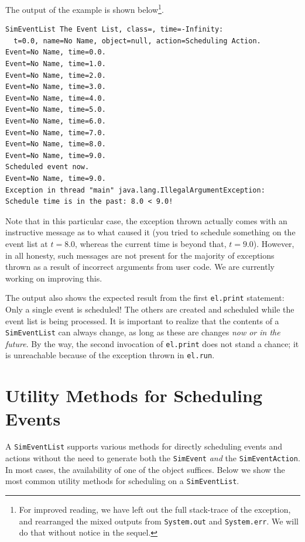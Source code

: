 \documentclass[12pt]{book}
\begin{document}
The output of the example is shown below\footnote{
  For improved reading, we have left out the full stack-trace of the exception,
  and rearranged the mixed outputs from \lstinline{System.out} and \lstinline{System.err}.
  We will do that without notice in the sequel.
}.
\begin{lstlisting}[basicstyle=\tiny]
SimEventList The Event List, class=, time=-Infinity:
  t=0.0, name=No Name, object=null, action=Scheduling Action.
Event=No Name, time=0.0.
Event=No Name, time=1.0.
Event=No Name, time=2.0.
Event=No Name, time=3.0.
Event=No Name, time=4.0.
Event=No Name, time=5.0.
Event=No Name, time=6.0.
Event=No Name, time=7.0.
Event=No Name, time=8.0.
Event=No Name, time=9.0.
Scheduled event now.
Event=No Name, time=9.0.
Exception in thread "main" java.lang.IllegalArgumentException:
Schedule time is in the past: 8.0 < 9.0!
\end{lstlisting}
Note that in this particular case,
  the exception thrown actually comes with an
  instructive message as to what caused it
  (you tried to schedule something on the event list at $t=8.0$,
   whereas the current time is beyond that, $t=9.0$).
However, in all honesty,
  such messages are not present
  for the majority of exceptions thrown
  as a result of incorrect arguments from user code.
We are currently working on improving this.

The output also shows the expected result from the first \lstinline{el.print} statement:
Only a single event is scheduled!
The others are created and scheduled while the event list is being processed.
It is important to realize that the contents of a \lstinline{SimEventList}
  can always change, as long as these are changes {\em now or in the future}.
By the way, the second invocation of \lstinline{el.print} does not stand a chance;
  it is unreachable because of the exception thrown in \lstinline{el.run}.

\section{Utility Methods for Scheduling Events}

A \lstinline{SimEventList} supports various methods for
  directly scheduling events and actions
  without the need to generate both
  the \lstinline{SimEvent} {\em and\/} the \lstinline{SimEventAction}.
In most cases, the availability of one of the object suffices.
Below we show the most common utility methods for scheduling on a \lstinline{SimEventList}.
\end{document}
